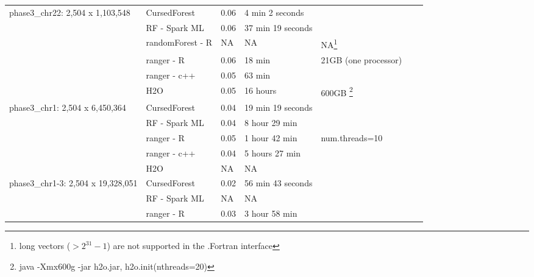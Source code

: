 \documentclass[11pt]{article}
\newcommand{\cursedforest}{{\sc CursedForest}}
\begin{document}
\begin{sidewaystable}[!ht]
\begin{minipage}{\textwidth}
\begin{tabular}{|l|l|l|l|l|l|p{1cm}|}
 \hline
\multirow{3}{*}{phase3\_chr22: 2,504 x 1,103,548}   & \cursedforest & 0.06 & 4 min 2 seconds & \\  %
						  & RF - Spark ML   & 0.06 & 37 min 19 seconds  & \\  %
                                                    & randomForest - R        & NA         & NA               & NA\footnote{long vectors ($> 2^31-1$)  are not supported in the .Fortran interface} \\ %
                                                    & ranger - R    & 0.06       & 18 min        & 21GB (one processor) \\ %
                                                    & ranger - c++ & 0.05  & 63 min &   \\
			                           & H2O           & 0.05       & 16 hours         & 600GB \footnote{java -Xmx600g -jar h2o.jar,   h2o.init(nthreads=20)} \\  %
\hline
\multirow{3}{*}{phase3\_chr1: 2,504 x 6,450,364}    & \cursedforest & 0.04  & 19 min 19 seconds &        \\ %
                                                    & RF - Spark ML  &  0.04       & 8 hour 29 min   &     \\ %
                                                   & ranger - R      & 0.05       & 1 hour 42 min          & num.threads=10 \\ %
                                                   & ranger - c++ & 0.04 & 5 hours 27 min &  \\
                                                    &H2O & NA & NA &   \\
\hline
\multirow{3}{*}{phase3\_chr1-3: 2,504 x 19,328,051} & \cursedforest & 0.02  & 56 min 43 seconds     &        \\ %
                                                    & RF - Spark ML  &  NA           &  NA                                                     & \\ %
  						 & ranger - R      & 0.03      &    3 hour 58 min  &   \\ %
						 

\end{tabular}
\end{minipage}
\end{sidewaystable}
\end{document}
